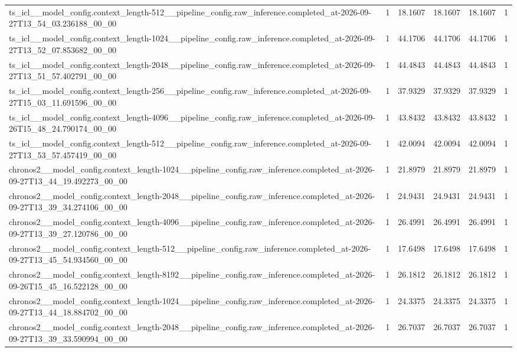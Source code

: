 \begin{tabular}{llllll}
ts\_icl\_\_model\_config.context\_length-512\_\_pipeline\_config.raw\_inference.completed\_at-2026-09-27T13\_54\_03.236188\_00\_00 & 1 & 18.1607 & 18.1607 & 18.1607 & 1 \\
ts\_icl\_\_model\_config.context\_length-1024\_\_pipeline\_config.raw\_inference.completed\_at-2026-09-27T13\_52\_07.853682\_00\_00 & 1 & 44.1706 & 44.1706 & 44.1706 & 1 \\
ts\_icl\_\_model\_config.context\_length-2048\_\_pipeline\_config.raw\_inference.completed\_at-2026-09-27T13\_51\_57.402791\_00\_00 & 1 & 44.4843 & 44.4843 & 44.4843 & 1 \\
ts\_icl\_\_model\_config.context\_length-256\_\_pipeline\_config.raw\_inference.completed\_at-2026-09-27T15\_03\_11.691596\_00\_00 & 1 & 37.9329 & 37.9329 & 37.9329 & 1 \\
ts\_icl\_\_model\_config.context\_length-4096\_\_pipeline\_config.raw\_inference.completed\_at-2026-09-26T15\_48\_24.790174\_00\_00 & 1 & 43.8432 & 43.8432 & 43.8432 & 1 \\
ts\_icl\_\_model\_config.context\_length-512\_\_pipeline\_config.raw\_inference.completed\_at-2026-09-27T13\_53\_57.457419\_00\_00 & 1 & 42.0094 & 42.0094 & 42.0094 & 1 \\
chronos2\_\_model\_config.context\_length-1024\_\_pipeline\_config.raw\_inference.completed\_at-2026-09-27T13\_44\_19.492273\_00\_00 & 1 & 21.8979 & 21.8979 & 21.8979 & 1 \\
chronos2\_\_model\_config.context\_length-2048\_\_pipeline\_config.raw\_inference.completed\_at-2026-09-27T13\_39\_34.274106\_00\_00 & 1 & 24.9431 & 24.9431 & 24.9431 & 1 \\
chronos2\_\_model\_config.context\_length-4096\_\_pipeline\_config.raw\_inference.completed\_at-2026-09-27T13\_39\_27.120786\_00\_00 & 1 & 26.4991 & 26.4991 & 26.4991 & 1 \\
chronos2\_\_model\_config.context\_length-512\_\_pipeline\_config.raw\_inference.completed\_at-2026-09-27T13\_45\_54.934560\_00\_00 & 1 & 17.6498 & 17.6498 & 17.6498 & 1 \\
chronos2\_\_model\_config.context\_length-8192\_\_pipeline\_config.raw\_inference.completed\_at-2026-09-26T15\_45\_16.522128\_00\_00 & 1 & 26.1812 & 26.1812 & 26.1812 & 1 \\
chronos2\_\_model\_config.context\_length-1024\_\_pipeline\_config.raw\_inference.completed\_at-2026-09-27T13\_44\_18.884702\_00\_00 & 1 & 24.3375 & 24.3375 & 24.3375 & 1 \\
chronos2\_\_model\_config.context\_length-2048\_\_pipeline\_config.raw\_inference.completed\_at-2026-09-27T13\_39\_33.590994\_00\_00 & 1 & 26.7037 & 26.7037 & 26.7037 & 1 \\

\end{tabular}
